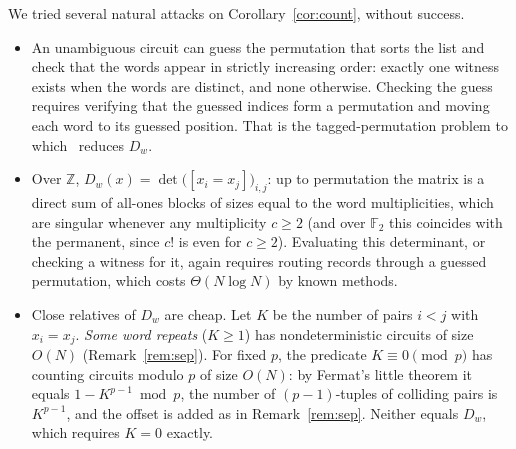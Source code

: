 \documentclass[11pt]{article}
\theoremstyle{definition}
\newcommand{\Dw}{D_w}
\begin{document}
We tried several natural attacks on Corollary~\ref{cor:count}, without success.
\begin{itemize}
\item An unambiguous circuit can guess the permutation that sorts the list and check that the words appear in strictly increasing order: exactly one witness exists when the words are distinct, and none otherwise. Checking the guess requires verifying that the guessed indices form a permutation and moving each word to its guessed position. That is the tagged-permutation problem to which~\cite[Section~4.1]{OAI-MM} reduces $\Dw$.
\item Over $\mathbb{Z}$, $\Dw(x)=\det\bigl([x_i=x_j]\bigr)_{i,j}$: up to permutation the matrix is a direct sum of all-ones blocks of sizes equal to the word multiplicities, which are singular whenever any multiplicity $c\ge2$ (and over $\mathbb F_2$ this coincides with the permanent, since $c!$ is even for $c\ge2$). Evaluating this determinant, or checking a witness for it, again requires routing records through a guessed permutation, which costs $\Theta(N\log N)$ by known methods.
\item Close relatives of $\Dw$ are cheap. Let $K$ be the number of pairs $i<j$ with $x_i=x_j$. \emph{Some word repeats} ($K\ge1$) has nondeterministic circuits of size $O(N)$ (Remark~\ref{rem:sep}). For fixed $p$, the predicate $K\equiv 0\pmod p$ has counting circuits modulo $p$ of size $O(N)$: by Fermat's little theorem it equals $1-K^{p-1}\bmod p$, the number of $(p-1)$-tuples of colliding pairs is $K^{p-1}$, and the offset is added as in Remark~\ref{rem:sep}. Neither equals $\Dw$, which requires $K=0$ exactly.
\end{itemize}
\end{document}

